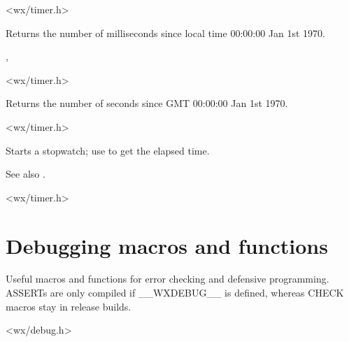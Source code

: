 
<wx/timer.h>

\label{wxgetlocaltimemillis}


Returns the number of milliseconds since local time 00:00:00 Jan 1st 1970.


,\\


<wx/timer.h>

\label{wxgetutctime}


Returns the number of seconds since GMT 00:00:00 Jan 1st 1970.




<wx/timer.h>

\label{wxstarttimer}


Starts a stopwatch; use  to get the elapsed time.

See also .


<wx/timer.h>

\section{Debugging macros and functions}\label{debugmacros}

Useful macros and functions for error checking and defensive programming. ASSERTs are only
compiled if \_\_WXDEBUG\_\_ is defined, whereas CHECK macros stay in release
builds.


<wx/debug.h>

\label{wxonassert}


